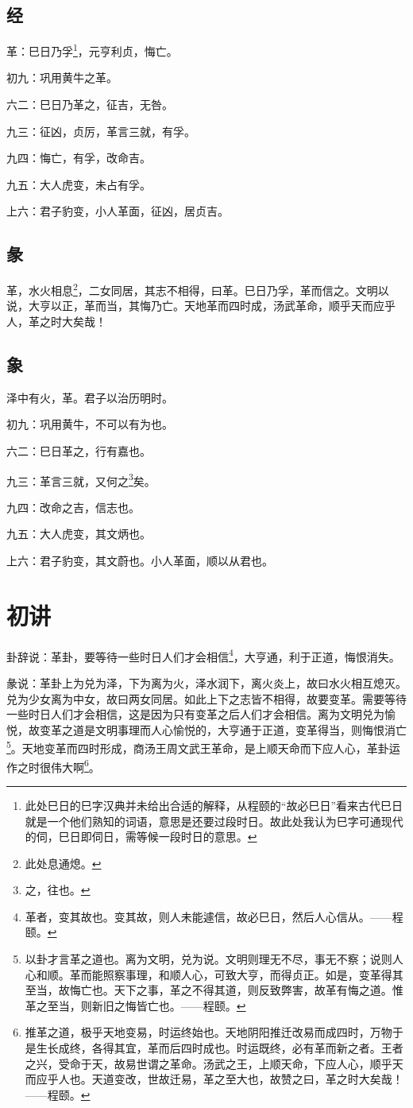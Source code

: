 \documentclass[12pt,oneside]{book}
\begin{document}
\subsection{经}
革：巳日乃孚\footnote{此处巳日的巳字汉典并未给出合适的解释，从程颐的“故必巳日”看来古代巳日就是一个他们熟知的词语，意思是还要过段时日。故此处我认为巳字可通现代的伺，巳日即伺日，需等候一段时日的意思。}，元亨利贞，悔亡。

初九：巩用黄牛之革。

六二：巳日乃革之，征吉，无咎。

九三：征凶，贞厉，革言三就，有孚。

九四：悔亡，有孚，改命吉。

九五：大人虎变，未占有孚。

上六：君子豹变，小人革面，征凶，居贞吉。

\subsection{彖}
革，水火相息\footnote{此处息通熄。}，二女同居，其志不相得，曰革。巳日乃孚，革而信之。文明以说，大亨以正，革而当，其悔乃亡。天地革而四时成，汤武革命，顺乎天而应乎人，革之时大矣哉！

\subsection{象}
泽中有火，革。君子以治历明时。

初九：巩用黄牛，不可以有为也。

六二：巳日革之，行有嘉也。

九三：革言三就，又何之\footnote{之，往也。}矣。

九四：改命之吉，信志也。

九五：大人虎变，其文炳也。

上六：君子豹变，其文蔚也。小人革面，顺以从君也。

\section{初讲}
卦辞说：革卦，要等待一些时日人们才会相信\footnote{革者，变其故也。变其故，则人未能遽信，故必巳日，然后人心信从。——程颐。}，大亨通，利于正道，悔恨消失。

彖说：革卦上为兑为泽，下为离为火，泽水润下，离火炎上，故曰水火相互熄灭。兑为少女离为中女，故曰两女同居。如此上下之志皆不相得，故要变革。需要等待一些时日人们才会相信，这是因为只有变革之后人们才会相信。离为文明兑为愉悦，故变革之道是文明事理而人心愉悦的，大亨通于正道，变革得当，则悔恨消亡\footnote{以卦才言革之道也。离为文明，兑为说。文明则理无不尽，事无不察；说则人心和顺。革而能照察事理，和顺人心，可致大亨，而得贞正。如是，变革得其至当，故悔亡也。天下之事，革之不得其道，则反致弊害，故革有悔之道。惟革之至当，则新旧之悔皆亡也。——程颐。}。天地变革而四时形成，商汤王周文武王革命，是上顺天命而下应人心，革卦运作之时很伟大啊\footnote{推革之道，极乎天地变易，时运终始也。天地阴阳推迁改易而成四时，万物于是生长成终，各得其宜，革而后四时成也。时运既终，必有革而新之者。王者之兴，受命于天，故易世谓之革命。汤武之王，上顺天命，下应人心，顺乎天而应乎人也。天道变改，世故迁易，革之至大也，故赞之曰，革之时大矣哉！——程颐。}。
\end{document}
